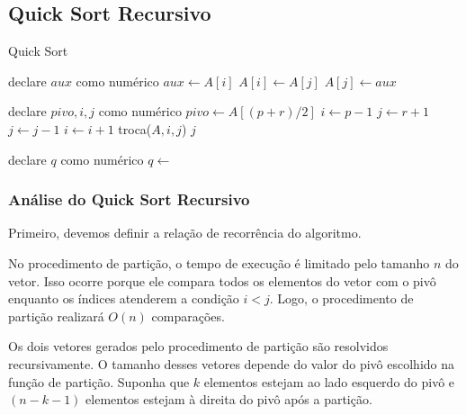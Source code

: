 \subsection{Quick Sort Recursivo}

\begin{algorithm}
	\caption{Quick Sort}
	\label{algo:bubble_sort}
	\begin{algorithmic}[1]
		\Statex
		\State declare $aux$ como numérico
		\State $aux \gets A[i]$
		\State $A[i] \gets A[j]$
		\State $A[j] \gets aux$
		\EndFunction
		\Statex

		\State declare $pivo, i, j$ como numérico
		\State $pivo \gets A[(p + r) / 2]$
		\State $i \gets p - 1$
		\State $j \gets r + 1$
		\Repeat
		\State $j \gets j - 1$
		\Repeat
		\State $i \gets i + 1$
		\State troca($A, i, j$)
		\EndIf
		\EndWhile
		\State \Return $j$
		\EndFunction
		\Statex

		\State declare $q$ como numérico
		\State $q \gets$ 
		\State {}
		\State {}
		\EndIf
		\EndFunction

	\end{algorithmic}
\end{algorithm}
\FloatBarrier

\newpage

\subsubsection{Análise do Quick Sort Recursivo}
Primeiro, devemos definir a relação de recorrência do algoritmo.

No procedimento de partição, o tempo de execução é limitado pelo tamanho \( n \) do vetor. Isso ocorre porque ele compara todos os elementos do vetor com o pivô enquanto os índices atenderem a condição \( i < j \). Logo, o procedimento de partição realizará \( O(n) \) comparações.

Os dois vetores gerados pelo procedimento de partição são resolvidos recursivamente. O tamanho desses vetores depende do valor do pivô escolhido na função de partição. Suponha que \( k \) elementos estejam ao lado esquerdo do pivô e \( (n - k - 1) \) elementos estejam à direita do pivô após a partição.

